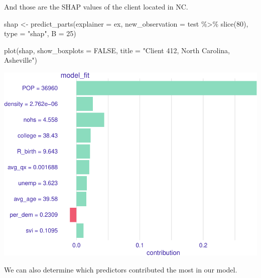 \documentclass[
]{article}
\newenvironment{Shaded}{\begin{snugshade}}{\end{snugshade}}
\newcommand{\AttributeTok}[1]{\textcolor[rgb]{0.77,0.63,0.00}{#1}}
\newcommand{\ConstantTok}[1]{\textcolor[rgb]{0.00,0.00,0.00}{#1}}
\newcommand{\DecValTok}[1]{\textcolor[rgb]{0.00,0.00,0.81}{#1}}
\newcommand{\FunctionTok}[1]{\textcolor[rgb]{0.00,0.00,0.00}{#1}}
\newcommand{\NormalTok}[1]{#1}
\newcommand{\OtherTok}[1]{\textcolor[rgb]{0.56,0.35,0.01}{#1}}
\newcommand{\SpecialCharTok}[1]{\textcolor[rgb]{0.00,0.00,0.00}{#1}}
\newcommand{\StringTok}[1]{\textcolor[rgb]{0.31,0.60,0.02}{#1}}
\begin{document}
And those are the SHAP values of the client located in NC.

\begin{Shaded}
\begin{Highlighting}[]
\NormalTok{shap }\OtherTok{\textless{}{-}} \FunctionTok{predict\_parts}\NormalTok{(}\AttributeTok{explainer =}\NormalTok{ ex,}
                      \AttributeTok{new\_observation =}\NormalTok{ test }\SpecialCharTok{\%\textgreater{}\%} \FunctionTok{slice}\NormalTok{(}\DecValTok{80}\NormalTok{),}
                                 \AttributeTok{type =} \StringTok{"shap"}\NormalTok{,}
                                  \AttributeTok{B =} \DecValTok{25}\NormalTok{)}
\end{Highlighting}
\end{Shaded}

\begin{Shaded}
\begin{Highlighting}[]
\FunctionTok{plot}\NormalTok{(shap, }\AttributeTok{show\_boxplots =} \ConstantTok{FALSE}\NormalTok{, }\AttributeTok{title =} \StringTok{"Client 412, North Carolina, Asheville"}\NormalTok{)}
\end{Highlighting}
\end{Shaded}

\includegraphics{figures/report/fig-unnamed-chunk-33-1.pdf}

We can also determine which predictors contributed the most in our
model.
\end{document}
